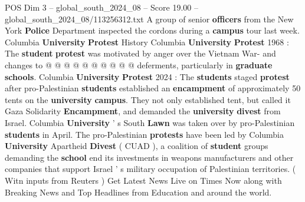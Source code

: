 \begin{textsample}{POS Dim 3 – global\_south\_2024\_08 – Score 19.00 – global\_south\_2024\_08/113256312.txt}
A group of senior \textbf{officers} from the New York \textbf{Police} Department inspected the cordons during a \textbf{campus} tour last week.
Columbia \textbf{University} \textbf{Protest} History Columbia \textbf{University} \textbf{Protest} 1968 : The \textbf{student} \textbf{protest} was motivated by anger over the Vietnam War- and changes to @ @ @ @ @ @ @ @ @ @ deferments, particularly in \textbf{graduate} \textbf{schools}.
Columbia \textbf{University} \textbf{Protest} 2024 : The \textbf{students} staged \textbf{protest} after pro-Palestinian \textbf{students} established an \textbf{encampment} of approximately 50 tents on the \textbf{university} \textbf{campus}.
They not only established tent, but called it Gaza Solidarity \textbf{Encampment}, and demanded the \textbf{university} \textbf{divest} from Israel.
Columbia \textbf{University} ' s South \textbf{Lawn} was taken over by pro-Palestinian \textbf{students} in April.
The pro-Palestinian \textbf{protests} have been led by Columbia \textbf{University} Apartheid \textbf{Divest} ( CUAD ), a coalition of \textbf{student} groups demanding the \textbf{school} end its investments in weapons manufacturers and other companies that support Israel ' s military occupation of Palestinian territories. ( Witn inputs from Reuters ) Get Latest News Live on Times Now along with Breaking News and Top Headlines from Education and around the world.

\end{textsample}
